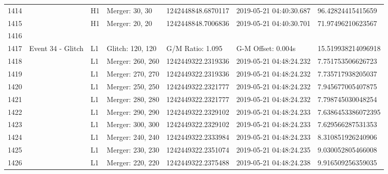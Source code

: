 \begin{longtable}{lllllll}
1414 &                                                    &       H1 &    Merger: 30, 30 &  1242448848.6870117 &  2019-05-21 04:40:30.687 &   96.42824415415659 \\
1415 &                                                    &       H1 &    Merger: 20, 20 &  1242448848.7006836 &  2019-05-21 04:40:30.701 &   71.97496210623567 \\
1416 &                                                    &          &                   &                     &                          &                     \\
1417 &                                  Event 34 - Glitch &       L1 &  Glitch: 120, 120 &    G/M Ratio: 1.095 &       G-M Offset: 0.004s &  15.519938214096918 \\
1418 &                                                    &       L1 &  Merger: 260, 260 &  1242449322.2319336 &  2019-05-21 04:48:24.232 &   7.751753506626723 \\
1419 &                                                    &       L1 &  Merger: 270, 270 &  1242449322.2319336 &  2019-05-21 04:48:24.232 &   7.735717938205037 \\
1420 &                                                    &       L1 &  Merger: 250, 250 &  1242449322.2321777 &  2019-05-21 04:48:24.232 &   7.945677005407875 \\
1421 &                                                    &       L1 &  Merger: 280, 280 &  1242449322.2321777 &  2019-05-21 04:48:24.232 &   7.798745030048254 \\
1422 &                                                    &       L1 &  Merger: 290, 290 &  1242449322.2329102 &  2019-05-21 04:48:24.233 &  7.6386453386072395 \\
1423 &                                                    &       L1 &  Merger: 300, 300 &  1242449322.2329102 &  2019-05-21 04:48:24.233 &   7.629566287531353 \\
1424 &                                                    &       L1 &  Merger: 240, 240 &  1242449322.2333984 &  2019-05-21 04:48:24.233 &   8.310851926240906 \\
1425 &                                                    &       L1 &  Merger: 230, 230 &  1242449322.2351074 &  2019-05-21 04:48:24.235 &   9.030052805466008 \\
1426 &                                                    &       L1 &  Merger: 220, 220 &  1242449322.2375488 &  2019-05-21 04:48:24.238 &   9.916509256359035 \\

\end{longtable}
